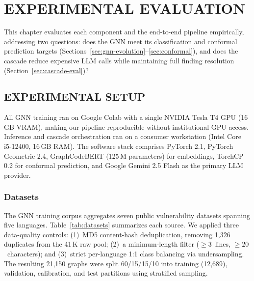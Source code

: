 \chapter{\uppercase{Experimental Evaluation}}

This chapter evaluates each component and the end-to-end pipeline empirically, addressing two questions: does the GNN meet its classification and conformal prediction targets (Sections~\ref{sec:gnn-evolution}--\ref{sec:conformal}), and does the cascade reduce expensive LLM calls while maintaining full finding resolution (Section~\ref{sec:cascade-eval})?

\section{\uppercase{Experimental Setup}}
\label{sec:setup}

All GNN training ran on Google Colab with a single NVIDIA Tesla T4 GPU (16\,GB VRAM), making our pipeline reproducible without institutional GPU access. Inference and cascade orchestration ran on a consumer workstation (Intel Core i5-12400, 16\,GB RAM). The software stack comprises PyTorch 2.1, PyTorch Geometric 2.4, GraphCodeBERT (125\,M parameters) for embeddings, TorchCP 0.2 for conformal prediction, and Google Gemini 2.5 Flash as the primary LLM provider.

\subsection{Datasets}

The GNN training corpus aggregates seven public vulnerability datasets spanning five languages. Table~\ref{tab:datasets} summarizes each source. We applied three data-quality controls: (1)~MD5 content-hash deduplication, removing 1,326 duplicates from the 41\,K raw pool; (2)~a minimum-length filter ($\geq 3$~lines, $\geq 20$~characters); and (3)~strict per-language 1:1 class balancing via undersampling. The resulting 21,150 graphs were split 60/15/15/10 into training (12,689), validation, calibration, and test partitions using stratified sampling.

